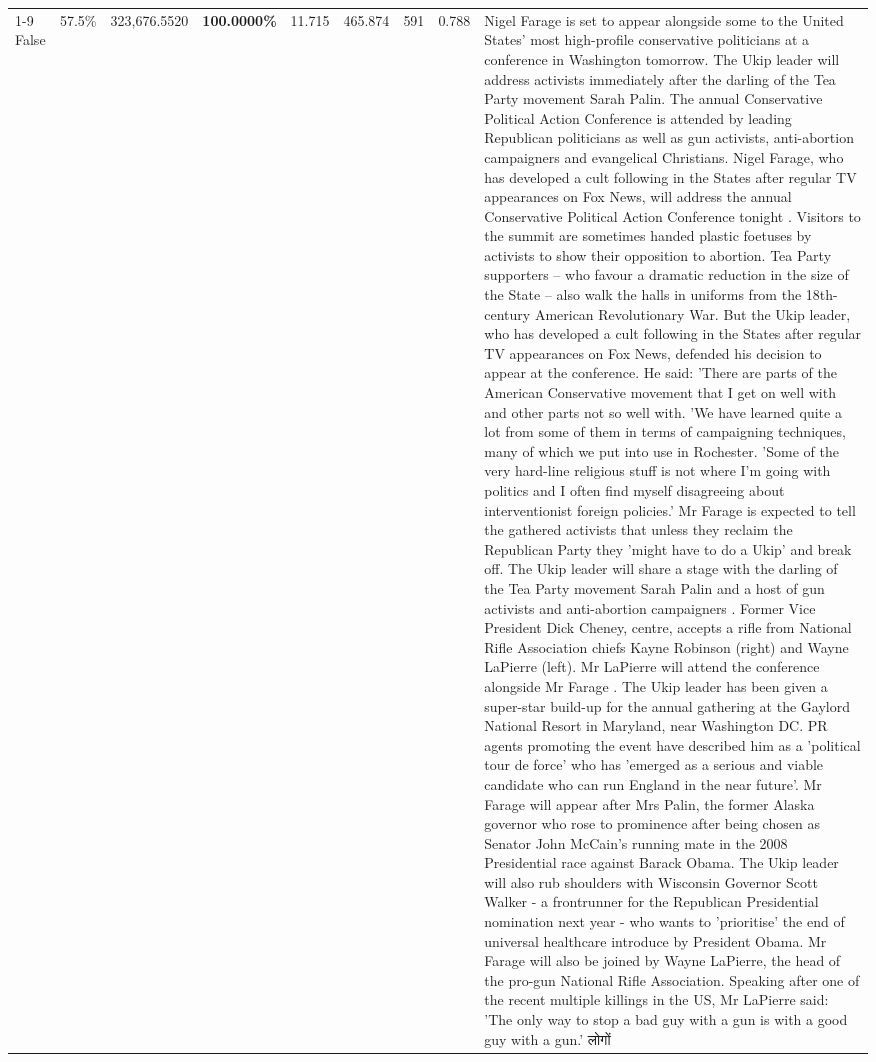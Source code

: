 \begin{table}[H]
\begin{tabular}{lllrlllll}
\cline{1-9}
False & 57.5\% & 323,676.5520 & \bfseries \color{red} 100.0000\% & 11.715 & 465.874 & 591 & 0.788 & Nigel Farage is set to appear alongside some to the United States' most high-profile conservative politicians at a conference in Washington tomorrow. The Ukip leader will address activists immediately after the darling of the Tea Party movement Sarah Palin. The annual Conservative Political Action Conference is attended by leading Republican politicians as well as gun activists, anti-abortion campaigners and evangelical Christians. Nigel Farage, who has developed a cult following in the States after regular TV appearances on Fox News, will address the annual Conservative Political Action Conference tonight . Visitors to the summit are sometimes handed plastic foetuses by activists to show their opposition to abortion. Tea Party supporters – who favour a dramatic reduction in the size of the State – also walk the halls in uniforms from the 18th-century American Revolutionary War. But the Ukip leader, who has developed a cult following in the States after regular TV appearances on Fox News, defended his decision to appear at the conference. He said: 'There are parts of the American Conservative movement that I get on well with and other parts not so well with. 'We have learned quite a lot from some of them in terms of campaigning techniques, many of which we put into use in Rochester. 'Some of the very hard-line religious stuff is not where I'm going with politics and I often find myself disagreeing about interventionist foreign policies.' Mr Farage is expected to tell the gathered activists that unless they reclaim the Republican Party they 'might have to do a Ukip' and break off. The Ukip leader will share a stage with the darling of the Tea Party movement Sarah Palin and a host of gun activists and anti-abortion campaigners . Former Vice President Dick Cheney, centre, accepts a rifle from National Rifle Association chiefs Kayne Robinson (right) and Wayne LaPierre (left). Mr LaPierre will attend the conference alongside Mr Farage . The Ukip leader has been given a super-star build-up for the annual gathering at the Gaylord National Resort in Maryland, near Washington DC. PR agents promoting the event have described him as a 'political tour de force' who has 'emerged as a serious and viable candidate who can run England in the near future'. Mr Farage will appear after Mrs Palin, the former Alaska governor who rose to prominence after being chosen as Senator John McCain's running mate in the 2008 Presidential race against Barack Obama. The Ukip leader will also rub shoulders with Wisconsin Governor Scott Walker - a frontrunner for the Republican Presidential nomination next year - who wants to 'prioritise' the end of universal healthcare introduce by President Obama. Mr Farage will also be joined by Wayne LaPierre, the head of the pro-gun National Rifle Association. Speaking after one of the recent multiple killings in the US, Mr LaPierre said: 'The only way to stop a bad guy with a gun is with a good guy with a gun.' लोगों \\

\end{tabular}
\end{table}
